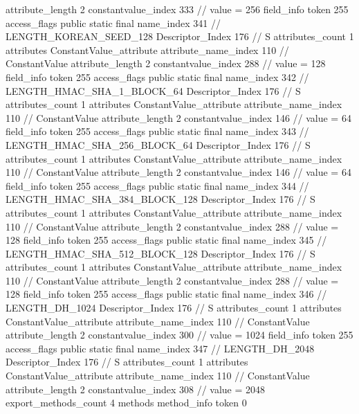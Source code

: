 {{{{{{{					attribute_length	2
					constantvalue_index	333		// value = 256
				}
				}
			}
			field_info {
				token	255
				access_flags	public static final
				name_index	341		// LENGTH_KOREAN_SEED_128
				Descriptor_Index	176		// S
				attributes_count	1
				attributes {
				ConstantValue_attribute {
					attribute_name_index	110		// ConstantValue
					attribute_length	2
					constantvalue_index	288		// value = 128
				}
				}
			}
			field_info {
				token	255
				access_flags	public static final
				name_index	342		// LENGTH_HMAC_SHA_1_BLOCK_64
				Descriptor_Index	176		// S
				attributes_count	1
				attributes {
				ConstantValue_attribute {
					attribute_name_index	110		// ConstantValue
					attribute_length	2
					constantvalue_index	146		// value = 64
				}
				}
			}
			field_info {
				token	255
				access_flags	public static final
				name_index	343		// LENGTH_HMAC_SHA_256_BLOCK_64
				Descriptor_Index	176		// S
				attributes_count	1
				attributes {
				ConstantValue_attribute {
					attribute_name_index	110		// ConstantValue
					attribute_length	2
					constantvalue_index	146		// value = 64
				}
				}
			}
			field_info {
				token	255
				access_flags	public static final
				name_index	344		// LENGTH_HMAC_SHA_384_BLOCK_128
				Descriptor_Index	176		// S
				attributes_count	1
				attributes {
				ConstantValue_attribute {
					attribute_name_index	110		// ConstantValue
					attribute_length	2
					constantvalue_index	288		// value = 128
				}
				}
			}
			field_info {
				token	255
				access_flags	public static final
				name_index	345		// LENGTH_HMAC_SHA_512_BLOCK_128
				Descriptor_Index	176		// S
				attributes_count	1
				attributes {
				ConstantValue_attribute {
					attribute_name_index	110		// ConstantValue
					attribute_length	2
					constantvalue_index	288		// value = 128
				}
				}
			}
			field_info {
				token	255
				access_flags	public static final
				name_index	346		// LENGTH_DH_1024
				Descriptor_Index	176		// S
				attributes_count	1
				attributes {
				ConstantValue_attribute {
					attribute_name_index	110		// ConstantValue
					attribute_length	2
					constantvalue_index	300		// value = 1024
				}
				}
			}
			field_info {
				token	255
				access_flags	public static final
				name_index	347		// LENGTH_DH_2048
				Descriptor_Index	176		// S
				attributes_count	1
				attributes {
				ConstantValue_attribute {
					attribute_name_index	110		// ConstantValue
					attribute_length	2
					constantvalue_index	308		// value = 2048
				}
				}
			}
			}
			export_methods_count	4
			methods {
				method_info {
					token	0
}}}}}
